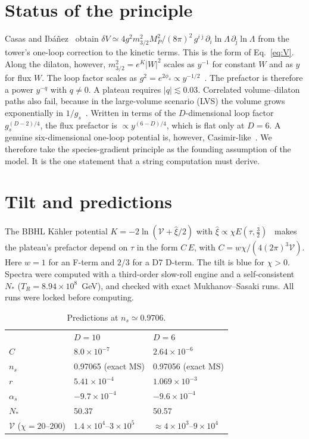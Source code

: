 \documentclass[aps,prd,twocolumn,superscriptaddress,nofootinbib,showkeys]{revtex4-2}
\begin{document}
\section{Status of the principle}
Casas and Ib\'a\~nez~\cite{CI} obtain $\delta V\simeq 4g^2m_{3/2}^2M_P^2/(8\pi)^2\,g^{i\bar\jmath}\partial_i\ln\Lambda\,\partial_{\bar\jmath}\ln\Lambda$ from the tower's one-loop correction to the kinetic terms. This is the form of Eq.~\eqref{eq:V}. Along the dilaton, however, $m_{3/2}^2=e^K|W|^2$ scales as $y^{-1}$ for constant $W$ and as $y$ for flux $W$. The loop factor scales as $g^2=e^{2\phi_4}\propto y^{-1/2}$~\cite{Ib}. The prefactor is therefore a power $y^{-q}$ with $q\neq0$. A plateau requires $|q|\lesssim0.03$. Correlated volume--dilaton paths also fail, because in the large-volume scenario (LVS) the volume grows exponentially in $1/g_s$~\cite{CP}. Written in terms of the $D$-dimensional loop factor $g_s^{(D-2)/4}$, the flux prefactor is $\propto y^{(6-D)/4}$, which is flat only at $D=6$. A genuine six-dimensional one-loop potential is, however, Casimir-like~\cite{SLED}. We therefore take the species-gradient principle as the founding assumption of the model. It is the one statement that a string computation must derive.

\section{Tilt and predictions}
The BBHL K\"ahler potential $K=-2\ln(\mathcal V+\hat\xi/2)$ with $\hat\xi\propto\chi E(\tau,\tfrac32)$~\cite{BBHL} makes the plateau's prefactor depend on $\tau$ in the form $C\,E$, with $C=w\chi/(4(2\pi)^3\mathcal V)$. Here $w=1$ for an F-term and $2/3$ for a D7 D-term. The tilt is blue for $\chi>0$. Spectra were computed with a third-order slow-roll engine and a self-consistent $N_*$ ($T_R=8.94\times10^8$~GeV), and checked with exact Mukhanov--Sasaki runs. All runs were locked before computing.

\begin{table}[b]
\caption{Predictions at $n_s\simeq0.9706$.}
\label{tab:pred}
\begin{ruledtabular}\footnotesize
\begin{tabular}{lll}
 & $D=10$ & $D=6$\\
$C$ & $8.0\times10^{-7}$ & $2.64\times10^{-6}$\\
$n_s$ & 0.97065 (exact MS) & 0.97056 (exact MS)\\
$r$ & $5.41\times10^{-4}$ & $1.069\times10^{-3}$\\
$\alpha_s$ & $-9.7\times10^{-4}$ & $-9.6\times10^{-4}$\\
$N_*$ & 50.37 & 50.57\\
$\mathcal V$ ($\chi=20$--200) & $1.4\times10^4$--$3\times10^5$ & $\approx4\times10^3$--$9\times10^4$\\
\end{tabular}
\end{ruledtabular}
\end{table}
\end{document}
